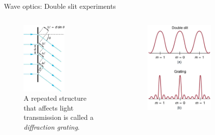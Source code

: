 \documentclass{beamer}
\begin{document}
\begin{frame}{Wave optics: Double slit experiments}
\begin{columns}[T]
\begin{column}{0.5\textwidth}
\footnotesize
\begin{figure}
\centering
\includegraphics[width=0.55\textwidth]{figures/slit7.png}
\caption{\label{fig:slit6} \footnotesize A repeated structure that affects light transmission is called a \textit{diffraction grating}.}
\end{figure}
\end{column}
\begin{column}{0.5\textwidth}
\footnotesize
\begin{figure}
\centering
\includegraphics[width=0.75\textwidth]{figures/slit8.png}

\end{figure}
\end{column}
\end{columns}
\end{frame}
\end{document}
